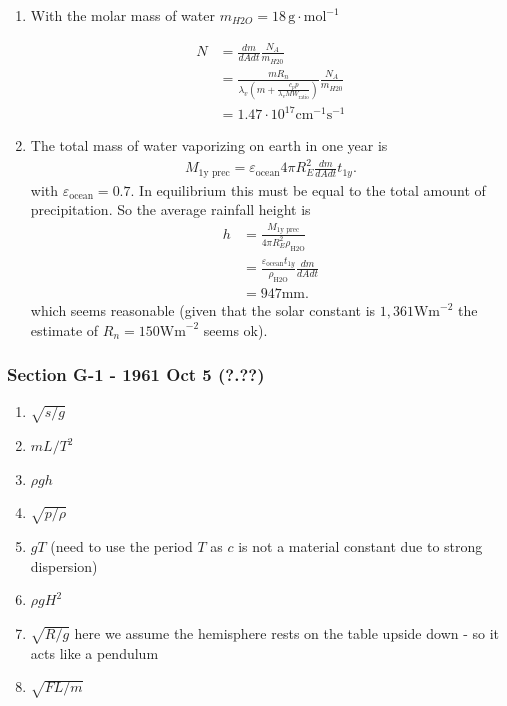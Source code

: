 \documentclass[10pt,a4paper]{book}
\theoremstyle{definition}
\begin{document}
\begin{enumerate}[label=(\alph*)]
\item With the molar mass of water $m_{H2O}=18\,\text{g}\cdot\text{mol}^{-1}$

\begin{align}
    N&=\frac{dm}{dA dt} \frac{N_A}{m_{H20}}\\
    &=\frac{m R_n}{\lambda_v(m+\frac{c_p p}{\lambda_v MW_\text{ratio}})}\frac{N_A}{m_{H20}}\\
    &=1.47\cdot10^{17}\text{cm}^{-1}\text{s}^{-1}
\end{align}

\item The total mass of water vaporizing on earth in one year is
\begin{align}
    M_\text{1y prec}=\varepsilon_\text{ocean} 4\pi R_E^2  \frac{dm}{dA dt} t_{1y}.
\end{align}
with $\varepsilon_\text{ocean}=0.7$. In equilibrium this must be equal to the total amount of precipitation. So the average rainfall height is 
\begin{align}
    h&=\frac{M_\text{1y prec}}{4\pi R_E^2\rho_\text{H2O}}\\
    &=\frac{\varepsilon_\text{ocean}t_{1y}}{\rho_\text{H2O}} \frac{dm}{dA dt}\\
    &=947\text{mm}.
\end{align}
which seems reasonable (given that the solar constant is $1,361\text{Wm}^{-2}$ the estimate of $R_n=150\text{Wm}^{-2}$ seems ok).
\end{enumerate}

\subsubsection{Section G-1 - 1961 Oct 5 (?.??)}
\begin{enumerate}[label=(\alph*)]
    \item $\sqrt{s/g}$
    \item $mL/T^2$
    \item $\rho g h$
    \item $\sqrt{p/\rho}$
    \item $gT$ (need to use the period $T$ as $c$ is not a material constant due to strong dispersion)
    \item $\rho g H^2$
    \item $\sqrt{R/g}$ here we assume the hemisphere rests on the table upside down - so it acts like a pendulum 
    \item $\sqrt{FL/m}$
\end{enumerate}
\end{document}
